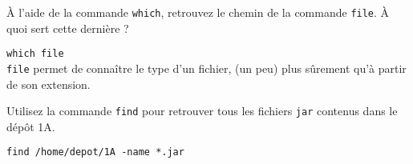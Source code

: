 \documentclass{scrartcl}
\begin{document}
\begin{question}[name=Q.]
	À l'aide de la commande \lstinline|which|, retrouvez le chemin de la commande \lstinline|file|. À quoi sert cette dernière ?
\end{question}
\begin{solution}
	\lstinline|which file| \\
	\lstinline|file| permet de connaître le type d'un fichier, (un peu) plus sûrement qu'à partir de son extension.
\end{solution}

\begin{question}[name=Q.]
	Utilisez la commande \lstinline|find| pour retrouver tous les fichiers \lstinline|jar| contenus dans le dépôt 1A.
\end{question}
\begin{solution}
	\lstinline|find /home/depot/1A -name *.jar|
\end{solution}
\end{document}
